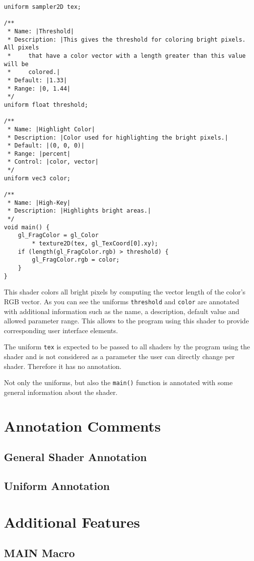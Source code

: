 \documentclass[11pt,a4paper]{scrreprt}
\begin{document}
\begin{lstlisting}
uniform sampler2D tex;

/**
 * Name: |Threshold|
 * Description: |This gives the threshold for coloring bright pixels. All pixels
 *     that have a color vector with a length greater than this value will be
 *     colored.|
 * Default: |1.33|
 * Range: |0, 1.44|
 */
uniform float threshold;

/**
 * Name: |Highlight Color|
 * Description: |Color used for highlighting the bright pixels.|
 * Default: |(0, 0, 0)|
 * Range: |percent|
 * Control: |color, vector|
 */
uniform vec3 color;

/**
 * Name: |High-Key|
 * Description: |Highlights bright areas.|
 */
void main() {
    gl_FragColor = gl_Color
        * texture2D(tex, gl_TexCoord[0].xy);
    if (length(gl_FragColor.rgb) > threshold) {
        gl_FragColor.rgb = color;
    }
}
\end{lstlisting}

This shader colors all bright pixels by computing the vector length of the 
color's RGB vector. As you can see the uniforms \lstinline$threshold$ and 
\lstinline$color$ are annotated with additional information such as the name, 
a description, default value and allowed parameter range. This allows to the 
program using this shader to provide corresponding user interface elements.

The uniform \lstinline$tex$ is expected to be passed to all shaders by the 
program using the shader and is not considered as a parameter the user can 
directly change per shader. Therefore it has no annotation.

Not only the uniforms, but also the \lstinline$main()$ function is annotated 
with some general information about the shader.

\chapter{Annotation Comments}

\section{General Shader Annotation}

\section{Uniform Annotation}

\chapter{Additional Features}

\section{MAIN Macro}
\end{document}
